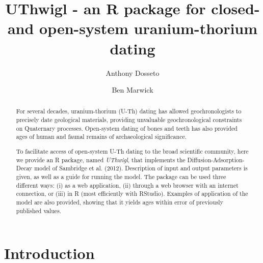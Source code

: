 \documentclass[]{elsarticle} %
\begin{document}
\begin{frontmatter}

  \title{UThwigl - an R package for closed- and open-system uranium-thorium dating}
    \author[University of Wollongong]{Anthony Dosseto}
    \author[University of Washington]{Ben Marwick}
  
      \address[University of Wollongong]{Wollongong Isotope Geochronology Laboratory, School of Earth, Atmosphere \& Life Sciences, University of Wollongong, Wollongong NSW Australia}
    \address[University of Washington]{Department of Anthropology, University of Washington, Seattle, WA, USA}
  
  \begin{abstract}
  For several decades, uranium-thorium (U-Th) dating has allowed geochronologists to precisely date geological materials, providing unvaluable geochronological constraints on Quaternary processes. Open-system dating of bones and teeth has also provided ages of human and faunal remains of archaeological significance.
  
  To facilitate access of open-system U-Th dating to the broad scientific community, here we provide an R package, named \emph{UThwigl}, that implements the Diffusion-Adsorption-Decay model of Sambridge et al. (2012). Description of input and output parameters is given, as well as a guide for running the model. The package can be used three different ways: (i) as a web application, (ii) through a web browser with an internet connection, or (iii) in R (most efficiently with RStudio). Examples of application of the model are also provided, showing that it yields ages within error of previously published values.\\
  \end{abstract}
  
 \end{frontmatter}

\newpage
\linenumbers

\hypertarget{introduction}{%
\section{Introduction}\label{introduction}}
\end{document}
